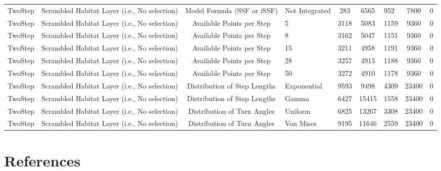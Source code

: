 \documentclass[10pt,a4paper]{article}
\begin{document}
\begin{table}
{\begin{tabular}[t]{lcclcclcc}
TwoStep & Scrambled Habitat Layer (i.e., No selection) & Model Formula (SSF or iSSF) & Not Integrated & 283 & 6565 & 952 & 7800 & 0\\
TwoStep & Scrambled Habitat Layer (i.e., No selection) & Available Points per Step & 5 & 3118 & 5083 & 1159 & 9360 & 0\\
TwoStep & Scrambled Habitat Layer (i.e., No selection) & Available Points per Step & 8 & 3162 & 5047 & 1151 & 9360 & 0\\
TwoStep & Scrambled Habitat Layer (i.e., No selection) & Available Points per Step & 15 & 3211 & 4958 & 1191 & 9360 & 0\\
TwoStep & Scrambled Habitat Layer (i.e., No selection) & Available Points per Step & 28 & 3257 & 4915 & 1188 & 9360 & 0\\
TwoStep & Scrambled Habitat Layer (i.e., No selection) & Available Points per Step & 50 & 3272 & 4910 & 1178 & 9360 & 0\\
TwoStep & Scrambled Habitat Layer (i.e., No selection) & Distribution of Step Lengths & Exponential & 9593 & 9498 & 4309 & 23400 & 0\\
TwoStep & Scrambled Habitat Layer (i.e., No selection) & Distribution of Step Lengths & Gamma & 6427 & 15415 & 1558 & 23400 & 0\\
TwoStep & Scrambled Habitat Layer (i.e., No selection) & Distribution of Turn Angles & Uniform & 6825 & 13267 & 3308 & 23400 & 0\\
TwoStep & Scrambled Habitat Layer (i.e., No selection) & Distribution of Turn Angles & Von Mises & 9195 & 11646 & 2559 & 23400 & 0\\

\end{tabular}}
\end{table}

\clearpage

\section*{References}\label{references}
\end{document}
